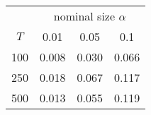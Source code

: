% 
\begin{tabular}{cccc}
  \hline
  & \multicolumn{3}{c}{nominal size $\alpha$} \\
 $T$ & 0.01 & 0.05 & 0.1 \\
 \hline
100 & 0.008 & 0.030 & 0.066 \\ 
  250 & 0.018 & 0.067 & 0.117 \\ 
  500 & 0.013 & 0.055 & 0.119 \\ 
   \hline
\end{tabular}
